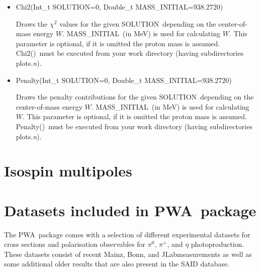 \documentclass[a4paper,10pt]{article}
\def\PWA{\ttfamily PWA\rmfamily\ }
\def\tt{\ttfamily}
\def\rm{\rmfamily}
\begin{document}
\begin{itemize}
\item
\tt Chi2(Int\_t SOLUTION=0, Double\_t MASS\_INITIAL=938.2720)\rm

Draws the $\chi^2$ values for the given \tt SOLUTION\rm\ depending on the center-of-mass energy $W$.
\tt MASS\_INITIAL\rm\ (in MeV) is used for calculating $W$. This parameter 
is optional, if it is omitted the proton mass is assumed.
\tt Chi2()\rm\ must be executed from your
work directory (having subdirectories \tt plots.\textit{n}\rm).

\item
\tt Penalty(Int\_t SOLUTION=0, Double\_t MASS\_INITIAL=938.2720)\rm

Draws the penalty contributions for the given \tt SOLUTION\rm\ depending on the center-of-mass energy $W$.
\tt MASS\_INITIAL\rm\ (in MeV) is used for calculating $W$. This parameter 
is optional, if it is omitted the proton mass is assumed.
\tt Penalty()\rm\ must be executed from your
work directory (having subdirectories \tt plots.\textit{n}\rm).
\end{itemize}

\section{Isospin multipoles}


\section{Datasets included in \PWA package}

The \PWA package comes with a selection of different experimental datasets for cross sections and polarisation observables
for $\pi^0$, $\pi^+$, and $\eta$ photoproduction. These datasets consist of recent Mainz, Bonn, and JLabmeasurements as well as
some additional older results that are also present in the SAID database.
\end{document}
